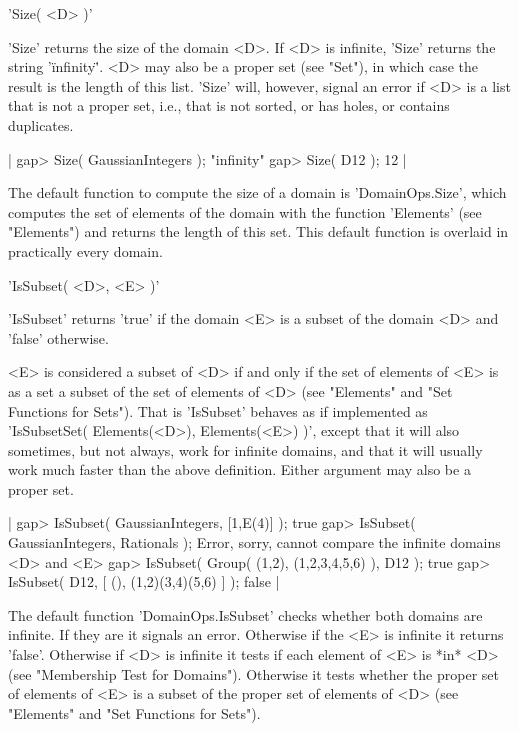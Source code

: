 'Size( <D> )'

'Size' returns the  size of the domain <D>.   If <D> is  infinite, 'Size'
returns the  string  '\"infinity\"'.  <D> may  also be a proper set  (see
"Set"), in  which  case  the result  is  the length of this list.  'Size'
will, however, signal an error if <D> is a list that is not a proper set,
i.e., that is not sorted, or has holes, or contains duplicates.

|    gap> Size( GaussianIntegers );
    "infinity"
    gap> Size( D12 );
    12 |

The default function to compute the size of a domain is 'DomainOps.Size',
which  computes the  set of  elements of  the  domain  with  the function
'Elements' (see "Elements") and  returns the  length  of this  set.  This
default function is overlaid in practically every domain.

%

'IsSubset( <D>, <E> )'

'IsSubset' returns 'true' if the domain <E> is a subset of the domain <D>
and 'false' otherwise.

<E> is considered a subset of <D> if  and only if the  set of elements of
<E> is as a set  a subset of  the set of  elements of <D> (see "Elements"
and  "Set Functions  for  Sets").   That  is  'IsSubset'  behaves  as  if
implemented as 'IsSubsetSet( Elements(<D>), Elements(<E>) )', except that
it  will also sometimes,  but not always,  work for infinite domains, and
that it will usually work much faster than the  above definition.  Either
argument may also be a proper set.

|    gap> IsSubset( GaussianIntegers, [1,E(4)] );
    true
    gap> IsSubset( GaussianIntegers, Rationals );
    Error, sorry, cannot compare the infinite domains <D> and <E>
    gap> IsSubset( Group( (1,2), (1,2,3,4,5,6) ), D12 );
    true
    gap> IsSubset( D12, [ (), (1,2)(3,4)(5,6) ] );
    false |

The default function 'DomainOps.IsSubset' checks whether both domains are
infinite.   If they are it  signals an  error.   Otherwise if the <E>  is
infinite it returns 'false'.  Otherwise if  <D> is infinite it  tests  if
each element of <E>  is  *in* <D>  (see "Membership  Test  for Domains").
Otherwise it tests whether the proper set  of elements of <E> is a subset
of the  proper set of elements of <D> (see "Elements"  and "Set Functions
for Sets").

